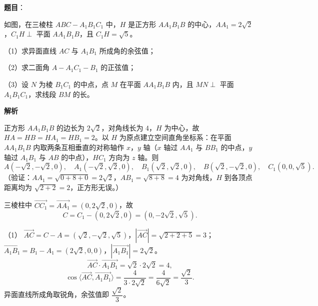 \begin{answer}

\textbf{题目}：

如图，在三棱柱 $ABC-A_1B_1C_1$ 中，$H$ 是正方形 $AA_1B_1B$ 的中心，$AA_1=2\sqrt2$，$C_1H\perp$ 平面 $AA_1B_1B$，且 $C_1H=\sqrt5$。

（1）求异面直线 $AC$ 与 $A_1B_1$ 所成角的余弦值；

（2）求二面角 $A-A_1C_1-B_1$ 的正弦值；

（3）设 $N$ 为棱 $B_1C_1$ 的中点，点 $M$ 在平面 $AA_1B_1B$ 内，且 $MN\perp$ 平面 $A_1B_1C_1$，求线段 $BM$ 的长。
\nopagebreak[4]
\begin{center}\end{center}
\nopagebreak[4]
\textbf{解析}

正方形 $AA_1B_1B$ 的边长为 $2\sqrt2$，对角线长为 $4$，$H$ 为中心，故 $HA=HB=HA_1=HB_1=2$。以 $H$ 为原点建立空间直角坐标系：在平面 $AA_1B_1B$ 内取两条互相垂直的对称轴作 $x$，$y$ 轴（$x$ 轴过 $AA_1$ 与 $BB_1$ 的中点，$y$ 轴过 $A_1B_1$ 与 $AB$ 的中点），$HC_1$ 方向为 $z$ 轴。则
\nopagebreak[4]
\[A(-\sqrt2,-\sqrt2,0),\quad A_1(-\sqrt2,\sqrt2,0),\quad B_1(\sqrt2,\sqrt2,0),\quad B(\sqrt2,-\sqrt2,0),\quad C_1(0,0,\sqrt5).\]
（验证：$AA_1=\sqrt{0+8+0}=2\sqrt2$，$AB_1=\sqrt{8+8}=4$ 为对角线，$H$ 到各顶点距离均为 $\sqrt{2+2}=2$，正方形无误。）

三棱柱中 $\overrightarrow{CC_1}=\overrightarrow{AA_1}=(0,2\sqrt2,0)$，故
\nopagebreak[4]
\[C=C_1-(0,2\sqrt2,0)=(0,-2\sqrt2,\sqrt5).\]

（1） $\overrightarrow{AC}=C-A=(\sqrt2,-\sqrt2,\sqrt5)$，$|\overrightarrow{AC}|=\sqrt{2+2+5}=3$；$\overrightarrow{A_1B_1}=B_1-A_1=(2\sqrt2,0,0)$，$|\overrightarrow{A_1B_1}|=2\sqrt2$。
\nopagebreak[4]
\[\overrightarrow{AC}\cdot\overrightarrow{A_1B_1}=\sqrt2\cdot2\sqrt2=4,\]
\nopagebreak[4]
\[\cos\langle\overrightarrow{AC},\overrightarrow{A_1B_1}\rangle=\frac{4}{3\cdot2\sqrt2}=\frac{4}{6\sqrt2}=\frac{\sqrt2}{3}.\]
异面直线所成角取锐角，余弦值即 $\dfrac{\sqrt2}{3}$。


\end{answer}
